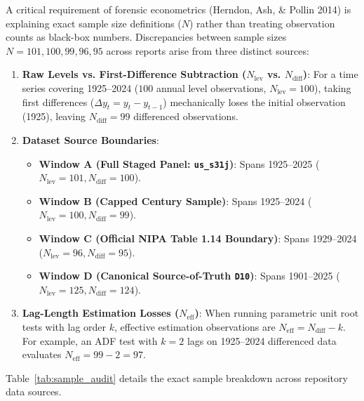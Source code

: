 \documentclass[11pt,a4paper]{article}
\begin{document}
A critical requirement of forensic econometrics (Herndon, Ash, \& Pollin 2014) is explaining exact sample size definitions ($N$) rather than treating observation counts as black-box numbers. Discrepancies between sample sizes $N = 101, 100, 99, 96, 95$ across reports arise from three distinct sources:

\begin{enumerate}
    \item \textbf{Raw Levels vs. First-Difference Subtraction ($N_{\text{lev}}$ vs. $N_{\text{diff}}$)}:
    For a time series covering 1925--2024 ($100$ annual level observations, $N_{\text{lev}} = 100$), taking first differences ($\Delta y_t = y_t - y_{t-1}$) mechanically loses the initial observation (1925), leaving $N_{\text{diff}} = 99$ differenced observations.
    
    \item \textbf{Dataset Source Boundaries}:
    \begin{itemize}
        \item \textbf{Window A (Full Staged Panel: \texttt{us\_s31j})}: Spans 1925--2025 ($N_{\text{lev}} = 101, N_{\text{diff}} = 100$).
        \item \textbf{Window B (Capped Century Sample)}: Spans 1925--2024 ($N_{\text{lev}} = 100, N_{\text{diff}} = 99$).
        \item \textbf{Window C (Official NIPA Table 1.14 Boundary)}: Spans 1929--2024 ($N_{\text{lev}} = 96, N_{\text{diff}} = 95$).
        \item \textbf{Window D (Canonical Source-of-Truth \texttt{D10})}: Spans 1901--2025 ($N_{\text{lev}} = 125, N_{\text{diff}} = 124$).
    \end{itemize}

    \item \textbf{Lag-Length Estimation Losses ($N_{\text{eff}}$)}:
    When running parametric unit root tests with lag order $k$, effective estimation observations are $N_{\text{eff}} = N_{\text{diff}} - k$. For example, an ADF test with $k=2$ lags on 1925--2024 differenced data evaluates $N_{\text{eff}} = 99 - 2 = 97$.
\end{enumerate}

Table~\ref{tab:sample_audit} details the exact sample breakdown across repository data sources.
\end{document}
